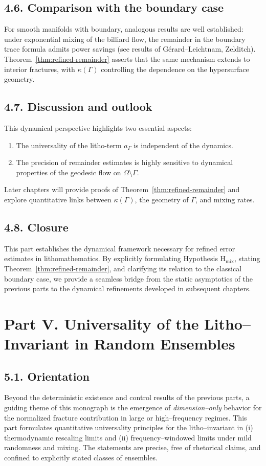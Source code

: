 \subsection*{4.6. Comparison with the boundary case}
For smooth manifolds with boundary, analogous results are well established: under exponential mixing of the billiard flow, the remainder in the boundary trace formula admits power savings (see results of Gérard--Leichtnam, Zelditch). Theorem~\ref{thm:refined-remainder} asserts that the same mechanism extends to interior fractures, with $\kappa(\Gamma)$ controlling the dependence on the hypersurface geometry.

\subsection*{4.7. Discussion and outlook}
This dynamical perspective highlights two essential aspects:

\begin{enumerate}
\item The universality of the litho-term $a_\Gamma$ is independent of the dynamics.
\item The precision of remainder estimates is highly sensitive to dynamical properties of the geodesic flow on $\Omega\setminus\Gamma$.
\end{enumerate}

Later chapters will provide proofs of Theorem~\ref{thm:refined-remainder} and explore quantitative links between $\kappa(\Gamma)$, the geometry of $\Gamma$, and mixing rates.

\subsection*{4.8. Closure}
This part establishes the dynamical framework necessary for refined error estimates in lithomathematics. By explicitly formulating Hypothesis H$_{\mathrm{mix}}$, stating Theorem~\ref{thm:refined-remainder}, and clarifying its relation to the classical boundary case, we provide a seamless bridge from the static asymptotics of the previous parts to the dynamical refinements developed in subsequent chapters.

\section*{Part V. Universality of the Litho–Invariant in Random Ensembles}

\subsection*{5.1. Orientation}
Beyond the deterministic existence and control results of the previous parts, a guiding theme of this monograph is the emergence of \emph{dimension–only} behavior for the normalized fracture contribution in large or high–frequency regimes. This part formulates quantitative universality principles for the litho–invariant in (i) thermodynamic rescaling limits and (ii) frequency–windowed limits under mild randomness and mixing. The statements are precise, free of rhetorical claims, and confined to explicitly stated classes of ensembles.

